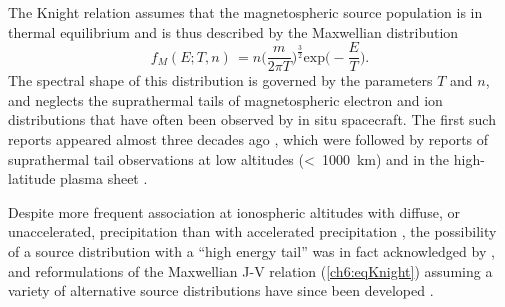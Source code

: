   The Knight relation assumes that the magnetospheric source population is in
  thermal equilibrium and is thus described by the Maxwellian distribution
  \begin{equation} \label{ch6:eqMax1D} f_{M}( E ; T, n) \, = n \Big (
    \dfrac{m}{2 \pi T} \Big )^{\frac{3}{2}} \textrm{exp} \Big (
    - \dfrac{E}{ T } \Big ).
  \end{equation}
  The spectral shape of this distribution is governed by the parameters $T$ and
  $n$, and neglects the suprathermal tails of magnetospheric electron and ion
  distributions that have often been observed by in situ spacecraft. The first
  such reports appeared almost three decades ago
  \citep{Christon1989,Christon1991}, which were followed by reports of
  suprathermal tail observations at low altitudes (<~1000~km) and in the
  high-latitude plasma sheet \citep{Wing1998,Kletzing2003}.

  Despite more frequent association at ionospheric altitudes with diffuse, or
  unaccelerated, precipitation than with accelerated precipitation \citep[e.g.,
  ][]{Newell2009,McIntosh2014}, the possibility of a source distribution with a
  ``high energy tail'' was in fact acknowledged by \citet{Knight1973}, and
  reformulations of the Maxwellian J-V relation (\ref{ch6:eqKnight}) assuming a
  variety of alternative source distributions have since been developed
  \citep{Pierrard1996,Janhunen1998,Dors1999,Bostrom2003a,Bostrom2004}.

